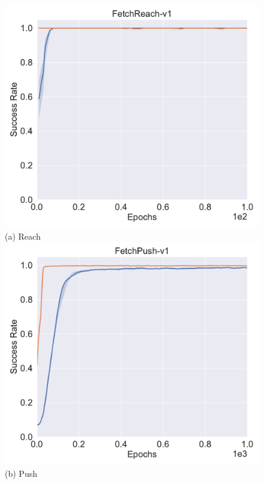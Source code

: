\begin{figure}[h!]
  \centering
  \includegraphics[width=\linewidth]{figures/chapter3/reach_her.pdf}
  ({a}) Reach
\endminipage
{}%
  \centering
  \includegraphics[width=\linewidth]{figures/chapter3/push_her.pdf}
  ({b}) Push
\endminipage\hfill
{}%
  \centering

\end{figure}
